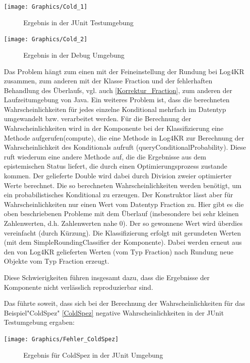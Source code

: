 \documentclass[draft]{scrreprt}
\begin{document}
{\texttt{[image: Graphics/Cold\_1]}
\begin{figure}[h]
	\caption{Ergebnis in der JUnit Testumgebung}
	\label{Cold_1}
\end{figure}

\texttt{[image: Graphics/Cold\_2]}
\begin{figure}[h]
	\caption{Ergebnis in der Debug Umgebung}
	\label{Cold_2}
\end{figure}

Das Problem hängt zum einen mit der Feineinstellung der Rundung bei Log4KR zusammen, zum anderen mit der Klasse Fraction und der fehlerhaften Behandlung des Überlaufs, vgl. auch \ref{Korrektur_Fraction}, zum anderen der Laufzeitumgebung von Java. 
Ein weiteres Problem ist, dass die berechneten Wahrscheinlichkeiten für jedes einzelne Konditional mehrfach im Datentyp umgewandelt bzw. verarbeitet werden. Für die Berechnung der Wahrscheinlichkeiten wird in der Komponente bei der Klassifizierung eine Methode aufgerufen(compute), die eine Methode in Log4KR zur Berechnung der Wahrscheinlichkeit des Konditionals aufruft (queryConditionalProbability). Diese ruft wiederum eine andere Methode auf, die die Ergebnisse aus dem epistemischen Status liefert, die durch einen Optimierungsprozess zustande kommen. Der gelieferte Double wird dabei durch Division zweier optimierter Werte berechnet. Die so berechneten Wahrscheinlichkeiten werden benötigt, um ein probabilistisches Konditional zu erzeugen. Der Konstruktor lässt aber für Wahrscheinlichkeiten nur einen Wert vom Datentyp Fraction zu. Hier gibt es die oben beschriebenen Probleme mit dem Überlauf (insbesondere bei sehr kleinen Zahlenwerten, d.h. Zahlenwerten nahe 0). Der so gewonnene Wert wird überdies vereinfacht (durch Kürzung). Die Klassifizierung erfolgt mit gerundeten Werten (mit dem SimpleRoundingClassifier der Komponente). Dabei werden erneut aus den von Log4KR gelieferten Werten (vom Typ Fraction) nach Rundung neue Objekte vom Typ Fraction erzeugt.

Diese Schwierigkeiten führen insgesamt dazu, dass die Ergebnisse der Komponente nicht verlässlich reproduzierbar sind.

Das führte soweit, dass sich bei der Berechnung der Wahrscheinlichkeiten für das Beispiel"{}ColdSpez"{} \ref{ColdSpez} negative Wahrscheinlichkeiten in der JUnit Testumgebung ergaben:

\texttt{[image: Graphics/Fehler\_ColdSpez]}
\begin{figure}[h]
	\caption{Ergebnis für ColdSpez in der JUnit Umgebung}
\end{figure}

}
\end{document}
